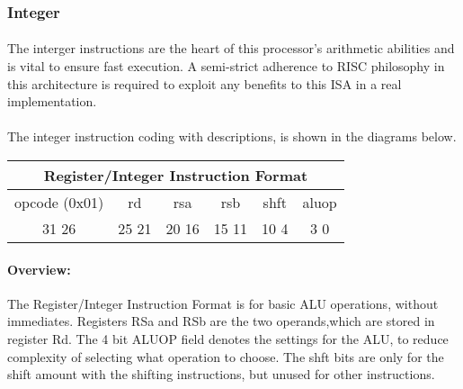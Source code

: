 \documentclass[letterpaper, 11pt]{article}
\begin{document}
\subsubsection{Integer}
\paragraph{}The interger instructions are the heart of this processor's arithmetic abilities and is vital to ensure fast execution. A semi-strict
adherence to RISC philosophy in this architecture is required to exploit any benefits to this ISA in a real implementation.
\paragraph{}The integer instruction coding with descriptions, is shown in the diagrams below.

\begin{center}
		\begin{tabular}{|c|c|c|c|c|c|}
			\multicolumn{6}{c}{Register/Integer Instruction Format}\\ \hline
				\hspace{2pt} opcode (0x01) \hspace{2pt} & \hspace{5pt} rd \hspace{5pt} &  \hspace{4pt} rsa \hspace{4pt} & \hspace{4pt}rsb  \hspace{4pt}& \hspace{10pt}shft  \hspace{10pt} & \hspace{3pt} aluop \hspace{3pt}   \\	\hline
			31 \hfill 26& 25 \hfill 21 &20 \hfill  16& 15 \hfill  11&10 \hfill   4&3 \hfill   0\\ \hline
		
	\end{tabular}
\end{center}	
\paragraph{Overview:}The Register/Integer Instruction Format is for basic ALU operations, without immediates. Registers RSa and RSb are the two operands,which
are stored in register Rd. The 4 bit ALUOP field denotes the settings for the ALU, to reduce complexity of selecting what operation to choose.
The shft bits are only for the shift amount with the shifting instructions, but unused for other instructions. 
\end{document}
